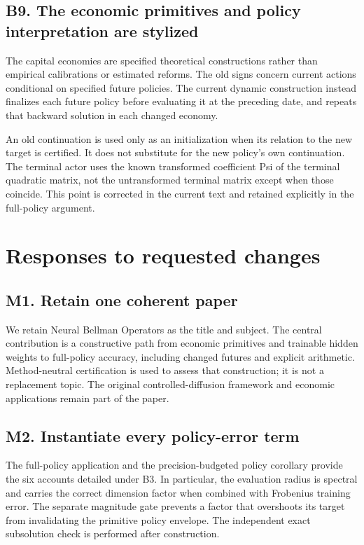 \documentclass[ecta,nameyear,draft]{econsocart}
\theoremstyle{definition}
\theoremstyle{remark}
\begin{document}
\subsection*{B9. The economic primitives and policy interpretation are stylized}

The capital economies are specified theoretical constructions rather than empirical calibrations or estimated reforms. The old signs concern current actions conditional on specified future policies. The current dynamic construction instead finalizes each future policy before evaluating it at the preceding date, and repeats that backward solution in each changed economy.

An old continuation is used only as an initialization when its relation to the new target is certified. It does not substitute for the new policy's own continuation. The terminal actor uses the known transformed coefficient Psi of the terminal quadratic matrix, not the untransformed terminal matrix except when those coincide. This point is corrected in the current text and retained explicitly in the full-policy argument.

\section*{Responses to requested changes}

\subsection*{M1. Retain one coherent paper}

We retain Neural Bellman Operators as the title and subject. The central contribution is a constructive path from economic primitives and trainable hidden weights to full-policy accuracy, including changed futures and explicit arithmetic. Method-neutral certification is used to assess that construction; it is not a replacement topic. The original controlled-diffusion framework and economic applications remain part of the paper.

\subsection*{M2. Instantiate every policy-error term}

The full-policy application and the precision-budgeted policy corollary provide the six accounts detailed under B3. In particular, the evaluation radius is spectral and carries the correct dimension factor when combined with Frobenius training error. The separate magnitude gate prevents a factor that overshoots its target from invalidating the primitive policy envelope. The independent exact subsolution check is performed after construction.
\end{document}
